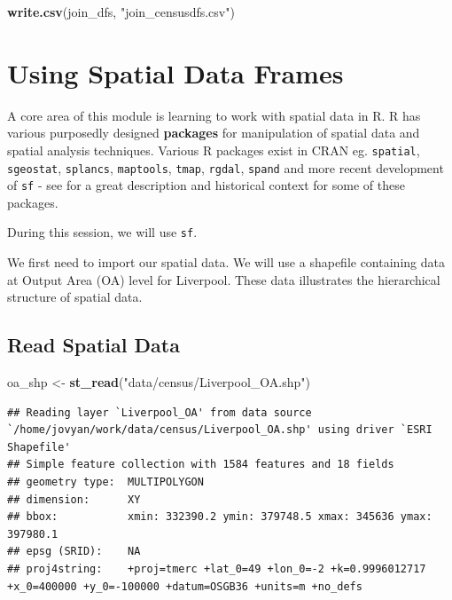 \documentclass[]{book}
\newenvironment{Shaded}{\begin{snugshade}}{\end{snugshade}}
\newcommand{\KeywordTok}[1]{\textcolor[rgb]{0.13,0.29,0.53}{\textbf{#1}}}
\newcommand{\NormalTok}[1]{#1}
\newcommand{\StringTok}[1]{\textcolor[rgb]{0.31,0.60,0.02}{#1}}
\begin{document}
\begin{Shaded}
\begin{Highlighting}[]
\KeywordTok{write.csv}\NormalTok{(join_dfs, }\StringTok{"join_censusdfs.csv"}\NormalTok{)}
\end{Highlighting}
\end{Shaded}

\hypertarget{using-spatial-data-frames}{%
\section{Using Spatial Data Frames}\label{using-spatial-data-frames}}

A core area of this module is learning to work with spatial data in R. R has various purposedly designed \textbf{packages} for manipulation of spatial data and spatial analysis techniques. Various R packages exist in CRAN eg. \texttt{spatial}, \texttt{sgeostat}, \texttt{splancs}, \texttt{maptools}, \texttt{tmap}, \texttt{rgdal}, \texttt{spand} and more recent development of \texttt{sf} - see \citet{Lovelace_et_al_2020_book} for a great description and historical context for some of these packages.

During this session, we will use \texttt{sf}.

We first need to import our spatial data. We will use a shapefile containing data at Output Area (OA) level for Liverpool. These data illustrates the hierarchical structure of spatial data.

\hypertarget{read-spatial-data}{%
\subsection{Read Spatial Data}\label{read-spatial-data}}

\begin{Shaded}
\begin{Highlighting}[]
\NormalTok{oa_shp <-}\StringTok{ }\KeywordTok{st_read}\NormalTok{(}\StringTok{"data/census/Liverpool_OA.shp"}\NormalTok{)}
\end{Highlighting}
\end{Shaded}

\begin{verbatim}
## Reading layer `Liverpool_OA' from data source `/home/jovyan/work/data/census/Liverpool_OA.shp' using driver `ESRI Shapefile'
## Simple feature collection with 1584 features and 18 fields
## geometry type:  MULTIPOLYGON
## dimension:      XY
## bbox:           xmin: 332390.2 ymin: 379748.5 xmax: 345636 ymax: 397980.1
## epsg (SRID):    NA
## proj4string:    +proj=tmerc +lat_0=49 +lon_0=-2 +k=0.9996012717 +x_0=400000 +y_0=-100000 +datum=OSGB36 +units=m +no_defs
\end{verbatim}
\end{document}
